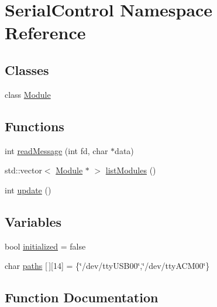 \hypertarget{namespaceSerialControl}{}\section{Serial\+Control Namespace Reference}
\label{namespaceSerialControl}
\subsection*{Classes}
\begin{DoxyCompactItemize}
\item 
class \mbox{\hyperlink{classSerialControl_1_1Module}{Module}}
\end{DoxyCompactItemize}
\subsection*{Functions}
\begin{DoxyCompactItemize}
\item 
int \mbox{\hyperlink{namespaceSerialControl_a275c08eb10687dadf058e79db3794aba}{read\+Message}} (int fd, char $\ast$data)
\item 
std\+::vector$<$ \mbox{\hyperlink{classSerialControl_1_1Module}{Module}} $\ast$ $>$ \mbox{\hyperlink{namespaceSerialControl_a72206d069455b02cd47cc58a1cfbace5}{list\+Modules}} ()
\item 
int \mbox{\hyperlink{namespaceSerialControl_ae11022dfef31e0b8d8124629b26476eb}{update}} ()
\end{DoxyCompactItemize}
\subsection*{Variables}
\begin{DoxyCompactItemize}
\item 
bool \mbox{\hyperlink{namespaceSerialControl_a275d9f14ad9b2900481a2f507df60d04}{initialized}} = false
\item 
char \mbox{\hyperlink{namespaceSerialControl_a0ed1846ed80502298402e9cd36725da3}{paths}} \mbox{[}$\,$\mbox{]}\mbox{[}14\mbox{]} = \{\char`\"{}/dev/tty\+U\+S\+B00\char`\"{},\char`\"{}/dev/tty\+A\+C\+M00\char`\"{}\}
\end{DoxyCompactItemize}


\subsection{Function Documentation}
\mbox{\label{namespaceSerialControl_a72206d069455b02cd47cc58a1cfbace5}} 
